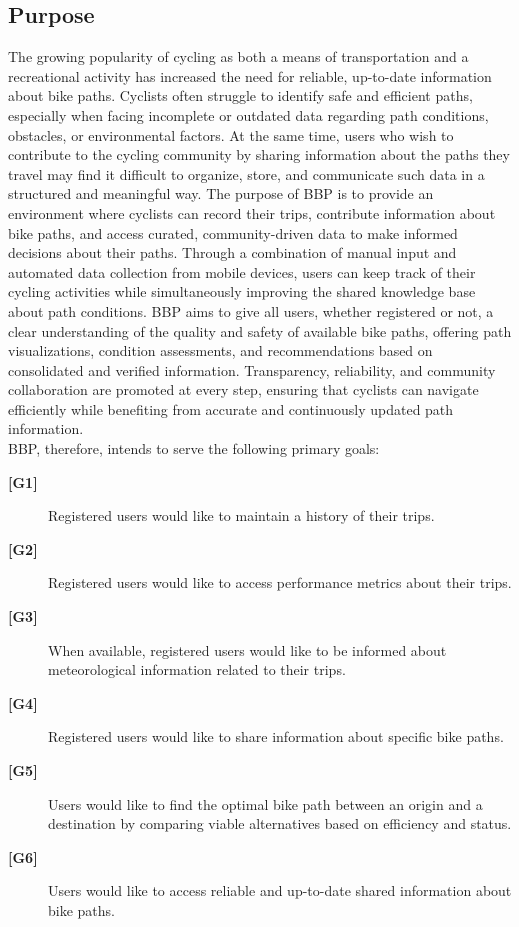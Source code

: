 \subsection{Purpose}
The growing popularity of cycling as both a means of transportation and a recreational activity has increased the need for reliable, up-to-date information about bike paths. Cyclists often struggle to identify safe and efficient paths, especially when facing incomplete or outdated data regarding path conditions, obstacles, or environmental factors. At the same time, users who wish to contribute to the cycling community by sharing information about the paths they travel may find it difficult to organize, store, and communicate such data in a structured and meaningful way.
The purpose of BBP is to provide an environment where cyclists can record their trips, contribute information about bike paths, and access curated, community-driven data to make informed decisions about their paths. Through a combination of manual input and automated data collection from mobile devices, users can keep track of their cycling activities while simultaneously improving the shared knowledge base about path conditions.
BBP aims to give all users, whether registered or not, a clear understanding of the quality and safety of available bike paths, offering path visualizations, condition assessments, and recommendations based on consolidated and verified information. Transparency, reliability, and community collaboration are promoted at every step, ensuring that cyclists can navigate efficiently while benefiting from accurate and continuously updated path information.
\\

\noindent
BBP, therefore, intends to serve the following primary goals:

\begin{description}
    \item[\textbf{[G1]}]Registered users would like to maintain a history of their trips.
    
    \item[\textbf{[G2]}] Registered users would like to access performance metrics about their trips.
    
    \item[\textbf{[G3]}] When available, registered users would like to be informed about meteorological information related to their trips.
    
    \item[\textbf{[G4]}] Registered users would like to share information about specific bike paths.
    
    \item[\textbf{[G5]}] Users would like to find the optimal bike path between an origin and a destination by comparing viable alternatives based on efficiency and status.
    
    \item[\textbf{[G6]}] Users would like to access reliable and up-to-date shared information about bike paths.
\end{description}


